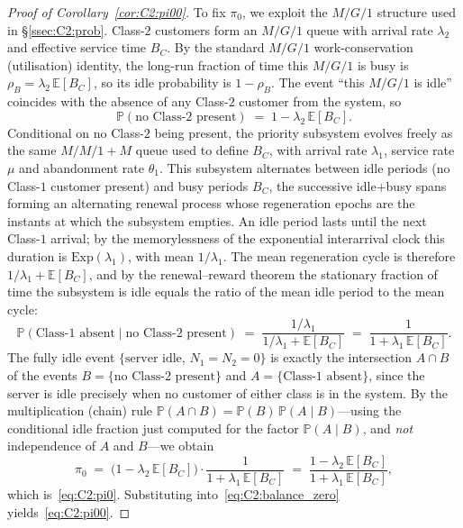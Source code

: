 \begin{proof}[Proof of Corollary~\ref{cor:C2:pi00}]
    To fix $\pi_0$, we exploit the $M/G/1$ structure used in \S\ref{ssec:C2:prob}. Class-$2$ customers form an $M/G/1$ queue with arrival rate $\lambda_2$ and effective service time $B_C$. By the standard $M/G/1$ work-conservation (utilisation) identity, the long-run fraction of time this $M/G/1$ is busy is $\rho_B=\lambda_2\,\mathbb{E}[B_C]$, so its idle probability is $1-\rho_B$. The event ``this $M/G/1$ is idle'' coincides with the absence of any Class-$2$ customer from the system, so
    \begin{equation}
        \mathbb{P}(\text{no Class-$2$ present}) \;=\; 1 - \lambda_2\,\mathbb{E}[B_C].
    \end{equation}
    Conditional on no Class-$2$ being present, the priority subsystem evolves freely as the same $M/M/1+M$ queue used to define $B_C$, with arrival rate $\lambda_1$, service rate $\mu$ and abandonment rate $\theta_1$. This subsystem alternates between idle periods (no Class-$1$ customer present) and busy periods $B_C$, the successive idle$+$busy spans forming an alternating renewal process whose regeneration epochs are the instants at which the subsystem empties. An idle period lasts until the next Class-$1$ arrival; by the memorylessness of the exponential interarrival clock this duration is $\mathrm{Exp}(\lambda_1)$, with mean $1/\lambda_1$. The mean regeneration cycle is therefore $1/\lambda_1+\mathbb{E}[B_C]$, and by the renewal--reward theorem the stationary fraction of time the subsystem is idle equals the ratio of the mean idle period to the mean cycle:
    \begin{equation}
        \mathbb{P}(\text{Class-$1$ absent} \mid \text{no Class-$2$ present})
        \;=\; \frac{1/\lambda_1}{1/\lambda_1+\mathbb{E}[B_C]}
        \;=\; \frac{1}{1+\lambda_1\,\mathbb{E}[B_C]}.
    \end{equation}
    The fully idle event $\{\text{server idle},\,N_1=N_2=0\}$ is exactly the intersection $A\cap B$ of the events $B=\{\text{no Class-$2$ present}\}$ and $A=\{\text{Class-$1$ absent}\}$, since the server is idle precisely when no customer of either class is in the system. By the multiplication (chain) rule $\mathbb{P}(A\cap B)=\mathbb{P}(B)\,\mathbb{P}(A\mid B)$---using the conditional idle fraction just computed for the factor $\mathbb{P}(A\mid B)$, and \emph{not} independence of $A$ and $B$---we obtain
    \begin{equation}
        \pi_0 \;=\; \bigl(1-\lambda_2\,\mathbb{E}[B_C]\bigr)\cdot\frac{1}{1+\lambda_1\,\mathbb{E}[B_C]} \;=\; \frac{1-\lambda_2\,\mathbb{E}[B_C]}{1+\lambda_1\,\mathbb{E}[B_C]},
    \end{equation}
    which is~\eqref{eq:C2:pi0}. Substituting into~\eqref{eq:C2:balance_zero} yields~\eqref{eq:C2:pi00}.


\end{proof}
